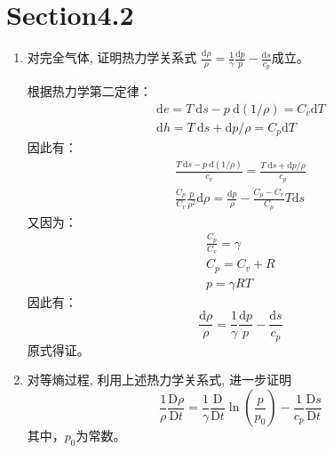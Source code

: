 \section*{Section4.2}

\begin{enumerate}
    \item 对完全气体, 证明热力学关系式
    \(
    \frac{\mathrm{d} \rho}{\rho}=\frac{1}{\gamma} \frac{\mathrm{d} p}{p}-\frac{\mathrm{d} s}{c_{p}}
    \)成立。

        根据热力学第二定律：
        \begin{equation}
            \begin{aligned}
                \mathrm{d} e 
                = T \mathrm{~d} s-p \mathrm{~d}(1 / \rho)
                = C_{v} \mathrm{d} T \\
                \mathrm{d} h 
                = T \mathrm{~d} s+\mathrm{d} p / \rho
                = C_{p} \mathrm{d} T
            \end{aligned}
        \end{equation}
        因此有：
        \begin{gather}
            \frac{T \mathrm{~d} s-p \mathrm{~d}(1 / \rho)}{c_{v}}
            =\frac{T \mathrm{~d} s+\mathrm{d} p / \rho}{c_{p}} \\
            \frac{C_{p}}{C_{v}} \frac{p}{\rho^{2}} \mathrm{d} \rho
            = \frac{\mathrm{d} p}{\rho} - \frac{C_{p}-C_{v}}{C_{p}} T \mathrm{d} s
        \end{gather}
        又因为：
        \begin{gather}
            \frac{C_{p}}{C_{v}} = \gamma \\
            C_{p} = C_{v} + R \\
            p = \gamma R T
        \end{gather}
        因此有：
        \begin{equation}
            \frac{\mathrm{d} \rho}{\rho}=\frac{1}{\gamma} \frac{\mathrm{d} p}{p}-\frac{\mathrm{d} s}{c_{p}}
        \end{equation}
        原式得证。

    \item 对等熵过程, 利用上述热力学关系式, 进一步证明
    \[
    \frac{1}{\rho} \frac{\mathrm{D} \rho}{\mathrm{D} t}=\frac{1}{\gamma} \frac{\mathrm{D}}{\mathrm{D} t} \ln \left(\frac{p}{p_{0}}\right)-\frac{1}{c_{p}} \frac{\mathrm{D} s}{\mathrm{D} t}
    \]
    其中，\(p_{0}\)为常数。


\end{enumerate}
